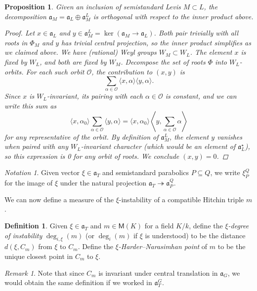 \documentclass[openany]{amsbook}
\newtheorem{proposition}[theorem]{Proposition}
\theoremstyle{definition}
\newtheorem{definition}[theorem]{Definition}
\theoremstyle{remark}
\newtheorem{notation}[theorem]{Notation}
\newtheorem{remark}[theorem]{Remark}
\numberwithin{equation}{section}
\renewcommand{\O}{\mathcal{O}}
\renewcommand{\-}{\operatorname{-}}
\renewcommand{\a}{\mathfrak{a}}
\newcommand{\bM}{\mathsf{M}}
\begin{document}
\begin{proposition}\label{prop.root.sum.formula.inner.prod}
    Given an inclusion of semistandard Levis $M \subset L$, the decomposition $\a_M = \a_L \oplus \a_M^L$ is orthogonal with respect to the inner product above.
    \begin{proof}
        Let $x \in \a_L$ and $y \in \a_M^L = \ker(\a_M \to \a_L)$. Both pair trivially with all roots in $\Phi_M$ and $y$ has trivial central projection, so the inner product simplifies as we claimed above. We have (rational) Weyl groups $W_M \subset W_L$. The element $x$ is fixed by $W_L$, and both are fixed by $W_M$. Decompose the set of roots $\Phi$ into $W_L$-orbits. For each such orbit $\O$, the contribution to $(x,y)$ is
        $$
            \sum_{\alpha \in \O} \langle x, \alpha \rangle \langle y, \alpha \rangle.
        $$
        Since $x$ is $W_L$-invariant, its pairing with each $\alpha \in \O$ is constant, and we can write this sum as 
        $$
            \langle x, \alpha_0 \rangle \sum_{\alpha \in \O} \langle y, \alpha \rangle = \langle x, \alpha_0 \rangle \left\langle y, \sum_{\alpha \in \O} \alpha \right\rangle
        $$
        for any representative of the orbit. By definition of $\a_M^L$, the element $y$ vanishes when paired with any $W_L$-invariant character (which would be an element of $\a_L^\star$), so this expression is 0 for any orbit of roots. We conclude $(x,y) = 0$. 
    \end{proof}
\end{proposition}

\begin{notation}\label{not.proj.aPQ}
    Given vector $\xi \in \a_T$ and semistandard parabolics $P \subseteq Q$, we write $\xi_P^Q$ for the image of $\xi$ under the natural projection $\a_T \twoheadrightarrow \a_P^Q$. 
\end{notation}

We can now define a measure of the $\xi$-instability of a compatible Hitchin triple $m$. 

\begin{definition}\label{def.xi.deg.HN}
    Given $\xi \in \a_T$ and $m \in \bM(K)$ for a field $K/k$, define the 
    \emph{$\xi$-degree of instability} $\deg_{i,\xi}(m)$ (or $\deg_i(m)$ if $\xi$ is understood) to be the distance $d(\xi, C_m)$ from $\xi$ to $C_m$. Define the \emph{$\xi$-Harder--Narasimhan point} of $m$ to be the unique closest point in $C_m$ to $\xi$.
\end{definition}

\begin{remark}
    Note that since $C_m$ is invariant under central translation in $\a_G$, we would obtain the same definition if we worked in $\a_T^G$. 
\end{remark}
\end{document}
